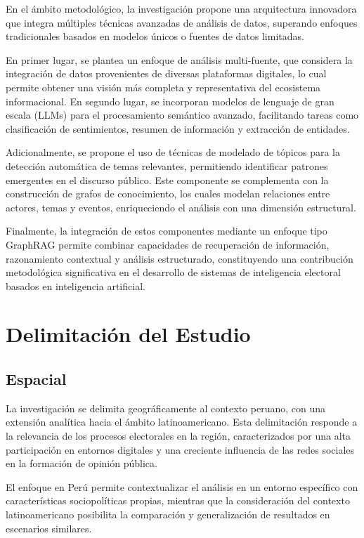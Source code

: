 \documentclass[listof=nochaptergap,12pt,times,authoryear]{report}
\begin{document}
En el ámbito metodológico, la investigación propone una arquitectura innovadora que integra múltiples técnicas avanzadas de análisis de datos, superando enfoques tradicionales basados en modelos únicos o fuentes de datos limitadas.

En primer lugar, se plantea un enfoque de análisis multi-fuente, que considera la integración de datos provenientes de diversas plataformas digitales, lo cual permite obtener una visión más completa y representativa del ecosistema informacional. En segundo lugar, se incorporan modelos de lenguaje de gran escala (LLMs) para el procesamiento semántico avanzado, facilitando tareas como clasificación de sentimientos, resumen de información y extracción de entidades.

Adicionalmente, se propone el uso de técnicas de modelado de tópicos para la detección automática de temas relevantes, permitiendo identificar patrones emergentes en el discurso público. Este componente se complementa con la construcción de grafos de conocimiento, los cuales modelan relaciones entre actores, temas y eventos, enriqueciendo el análisis con una dimensión estructural.

Finalmente, la integración de estos componentes mediante un enfoque tipo GraphRAG permite combinar capacidades de recuperación de información, razonamiento contextual y análisis estructurado, constituyendo una contribución metodológica significativa en el desarrollo de sistemas de inteligencia electoral basados en inteligencia artificial.

\section{Delimitación del Estudio}

\subsection{Espacial}

La investigación se delimita geográficamente al contexto peruano, con una extensión analítica hacia el ámbito latinoamericano. Esta delimitación responde a la relevancia de los procesos electorales en la región, caracterizados por una alta participación en entornos digitales y una creciente influencia de las redes sociales en la formación de opinión pública.

El enfoque en Perú permite contextualizar el análisis en un entorno específico con características sociopolíticas propias, mientras que la consideración del contexto latinoamericano posibilita la comparación y generalización de resultados en escenarios similares.
\end{document}
